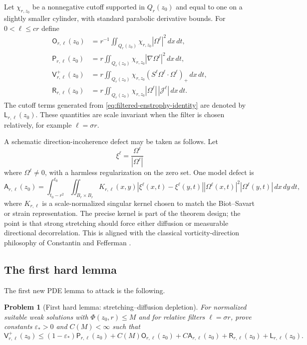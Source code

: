 \documentclass[11pt]{article}
\numberwithin{equation}{section}
\newtheorem{problem}[theorem]{Problem}
\theoremstyle{remark}
\newcommand{\eps}{\varepsilon}
\newcommand{\dx}{\,dx}
\newcommand{\dxdt}{\,dx\,dt}
\begin{document}
Let $\chi_{r,z_0}$ be a nonnegative cutoff supported in $Q_r(z_0)$ and equal to one on a slightly smaller cylinder, with standard parabolic derivative bounds. For $0<\ell\le c r$ define
\begin{align}
\mathsf O_{r,\ell}(z_0)&=r^{-1}\iint_{Q_r(z_0)}\chi_{r,z_0}|\Omega^\ell|^2\dxdt,\label{eq:filtered-O}\\
\mathsf P_{r,\ell}(z_0)&=r\iint_{Q_r(z_0)}\chi_{r,z_0}|\nabla\Omega^\ell|^2\dxdt,\label{eq:filtered-P}\\
\mathsf V^+_{r,\ell}(z_0)&=r\iint_{Q_r(z_0)}\chi_{r,z_0}(S^\ell\Omega^\ell\cdot\Omega^\ell)_+\dxdt,\label{eq:filtered-V}\\
\mathsf R_{r,\ell}(z_0)&=r\iint_{Q_r(z_0)}\chi_{r,z_0}|\Omega^\ell|\,|\mathcal J^\ell|\dxdt.\label{eq:filtered-R}
\end{align}
The cutoff terms generated from \eqref{eq:filtered-enstrophy-identity} are denoted by $\mathsf L_{r,\ell}(z_0)$. These quantities are scale invariant when the filter is chosen relatively, for example $\ell=\sigma r$.

A schematic direction-incoherence defect may be taken as follows. Let
\[
\xi^\ell=\frac{\Omega^\ell}{|\Omega^\ell|}
\]
where $\Omega^\ell\ne0$, with a harmless regularization on the zero set. One model defect is
\begin{equation}\label{eq:direction-defect}
\mathsf A_{r,\ell}(z_0)
=
\int_{t_0-r^2}^{t_0}\iint_{B_r\times B_r}
K_{r,\ell}(x,y)
|\xi^\ell(x,t)-\xi^\ell(y,t)|
|\Omega^\ell(x,t)|^2|\Omega^\ell(y,t)|\dx\,dy\,dt,
\end{equation}
where $K_{r,\ell}$ is a scale-normalized singular kernel chosen to match the Biot--Savart or strain representation. The precise kernel is part of the theorem design; the point is that strong stretching should force either diffusion or measurable directional decorrelation. This is aligned with the classical vorticity-direction philosophy of Constantin and Fefferman \cite{ConstantinFefferman1993}.

\subsection{The first hard lemma}

The first new PDE lemma to attack is the following.

\begin{problem}[First hard lemma: stretching--diffusion depletion]\label{prob:first-hard-lemma}
For normalized suitable weak solutions with $\Phi(z_0,r)\le M$ and for relative filters $\ell=\sigma r$, prove constants $\eps_*>0$ and $C(M)<\infty$ such that
\begin{equation}\label{eq:first-hard-lemma}
\mathsf V^+_{r,\ell}(z_0)
\le
(1-\eps_*)\mathsf P_{r,\ell}(z_0)
+C(M)\mathsf O_{r,\ell}(z_0)
+C\mathsf A_{r,\ell}(z_0)
+\mathsf R_{r,\ell}(z_0)
+\mathsf L_{r,\ell}(z_0).
\end{equation}
\end{problem}
\end{document}
